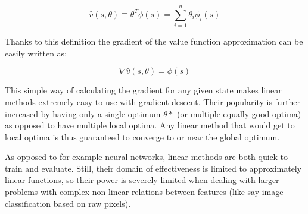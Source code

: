 \begin{equation}
  \hat{v}(s, \theta) \equiv \theta^T \phi(s) = \sum^n_{i=1} \theta_i \phi_i(s)
\end{equation}

Thanks to this definition the gradient of the value function approximation
can be easily written as:

\begin{equation}
  \nabla \hat{v}(s, \theta) = \phi(s)
\end{equation}

This simple way of calculating the gradient
for any given state makes linear methods extremely easy to use with gradient descent.
Their popularity is further increased
by having only a single optimum $\theta*$ (or multiple equally good optima)
as opposed to have multiple local optima.
Any linear method that would get to local optima
is thus guaranteed to converge to or near the global optimum.

As opposed to for example neural networks,
linear methods are both quick to train and evaluate.
Still, their domain of effectiveness is limited
to approximately linear functions,
so their power is severely limited when dealing with
larger problems with complex non-linear relations between features
(like say image classification based on raw pixels).
